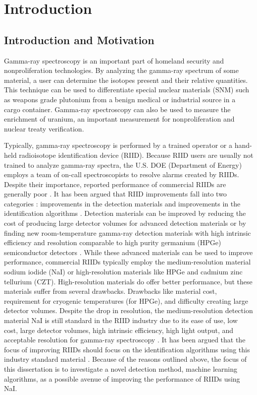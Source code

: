 \chapter{Introduction}

\section{Introduction and Motivation}

Gamma-ray spectroscopy is an important part of homeland security and nonproliferation technologies. By analyzing the gamma-ray spectrum of some material, a user can determine the isotopes present and their relative quantities. This technique can be used to differentiate special nuclear materials (SNM) such as weapons grade plutonium from a benign medical or industrial source in a cargo container. Gamma-ray spectroscopy can also be used to measure the enrichment of uranium, an important measurement for nonproliferation and nuclear treaty verification. 

Typically, gamma-ray spectroscopy is performed by a trained operator \cite{burr2009} or a hand-held radioisotope identification device (RIID). Because RIID users are usually not trained to analyze gamma-ray spectra, the U.S. DOE (Department of Energy) employs a team of on-call spectroscopists to resolve alarms created by RIIDs. Despite their importance, reported performance of commercial RIIDs are generally poor \cite{pibida2004,blackadar2003,blackadar2004}. It has been argued that RIID improvements fall into two categories \cite{swoboda2004}: improvements in the detection materials and improvements in the identification algorithms \cite{blackadar2003}. Detection materials can be improved by reducing the cost of producing large detector volumes for advanced detection materials \cite{Gostilo2004,Chen2018} or by finding new room-temperature gamma-ray detection materials with high intrinsic efficiency and resolution comparable to high purity germanium (HPGe) semiconductor detectors \cite{swoboda2004}. While these advanced materials can be used to improve performance, commercial RIIDs typically employ the medium-resolution material sodium iodide (NaI) or high-resolution materials like HPGe and cadmium zinc tellurium (CZT). High-resolution materials do offer better performance, but these materials suffer from several drawbacks. Drawbacks like material cost, requirement for cryogenic temperatures (for HPGe), and difficulty creating large detector volumes. Despite the drop in resolution, the medium-resolution detection material NaI is still standard in the RIID industry due to its ease of use, low cost, large detector volumes, high intrinsic efficiency, high light output, and acceptable resolution for gamma-ray spectroscopy \cite{swoboda2004}. It has been argued that the focus of improving RIIDs should focus on the identification algorithms using this industry standard material \cite{blackadar2003}. Because of the reasons outlined above, the focus of this dissertation is to investigate a novel detection method, machine learning algorithms, as a possible avenue of improving the performance of RIIDs using NaI.

